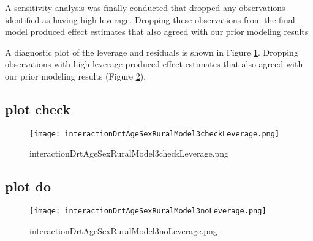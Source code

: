 \documentclass[a4paper]{article}                %
\begin{document}
        A sensitivity analysis was finally conducted that dropped any observations identified as having high leverage. Dropping these observations from the final model produced effect estimates that also agreed with our prior modeling results






        A diagnostic plot of the leverage and residuals is shown in Figure \ref{fig:interactionDrtAgeSexRuralModel3checkLeverage.png}.  Dropping observations with high leverage produced effect estimates that also agreed with our prior modeling results (Figure \ref{fig:interactionDrtAgeSexRuralModel3noLeverage.png}).



\subsection{plot check}


        \begin{figure}[!h]
        \centering
        \texttt{[image: interactionDrtAgeSexRuralModel3checkLeverage.png]}
        \caption{interactionDrtAgeSexRuralModel3checkLeverage.png}
        \label{fig:interactionDrtAgeSexRuralModel3checkLeverage.png}
        \end{figure}
        \clearpage



\subsection{plot do}

 \begin{figure}[!h]
        \centering
        \texttt{[image: interactionDrtAgeSexRuralModel3noLeverage.png]}
        \caption{interactionDrtAgeSexRuralModel3noLeverage.png}
        \label{fig:interactionDrtAgeSexRuralModel3noLeverage.png}
        \end{figure}
        \clearpage


\end{document}
